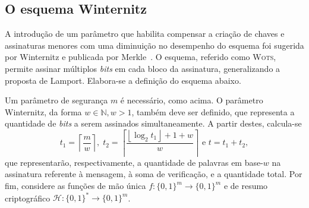 \documentclass[12pt]{report}
\newcommand{\binwds}[1]{\{0, 1\}^{#1}}
\begin{document}
\subsection{O esquema Winternitz}

A introdução de um parâmetro que habilita compensar a criação de chaves e
assinaturas menores com uma diminuição no desempenho do esquema foi sugerida
por Winternitz e publicada por Merkle~\cite{Merkle:1989:CDS:118209.118230}.
O esquema, referido como \textsc{Wots}, permite assinar múltiplos \emph{bits} em cada bloco da assinatura,
generalizando a proposta de Lamport. Elabora-se a definição do esquema abaixo.

Um parâmetro de segurança $m$ é necessário, como acima. O parâmetro
Winternitz, da forma $w \in \mathbb{N}, w > 1$, também deve ser definido, que
representa a quantidade de \emph{bits} a serem assinados simultaneamente.
A partir destes, calcula-se
    $$t_1 = \left\lceil \frac{m}{w} \right\rceil, \; t_2 = \left\lceil 
    \frac{\left\lfloor \log_2 t_1 \right\rfloor + 1 + w}{w} \right\rceil \text{ e }
    t = t_1 + t_2,$$
que representarão, respectivamente, a quantidade de palavras em base-$w$ na assinatura referente à mensagem, à soma de verificação, e a quantidade total.
Por fim, considere as funções de mão única
$f : \binwds{m} \longrightarrow \binwds{m}$ e de resumo criptográfico
$\mathcal{H} : \binwds{*} \longrightarrow \binwds{m}$.
\end{document}
